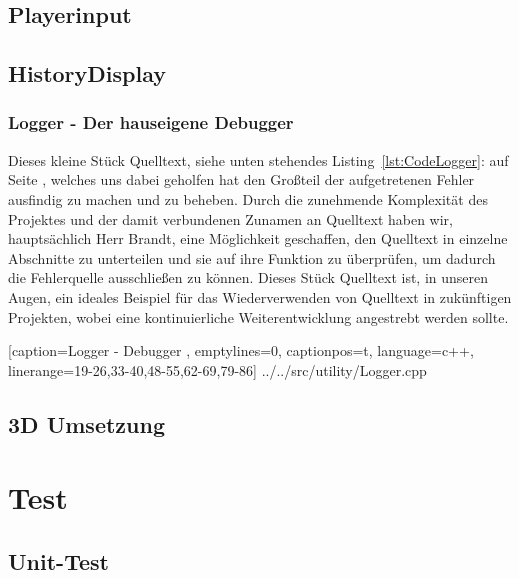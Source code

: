 \documentclass[a4paper]{scrartcl}
\begin{document}
\subsection{Playerinput}\label{ch:Playerinput}
\subsection{HistoryDisplay}\label{ch:HistoryDisplay}


\newpage
\subsubsection{Logger - Der hauseigene Debugger}\label{ch:Logger}
Dieses kleine Stück Quelltext, siehe unten stehendes Listing~\ref{lst:CodeLogger}: auf Seite \pageref{lst:CodeLogger}, welches uns dabei geholfen hat den Großteil der aufgetretenen Fehler ausfindig zu machen und zu beheben. Durch die zunehmende Komplexität des Projektes und der damit verbundenen Zunamen an Quelltext haben wir, hauptsächlich Herr Brandt, eine Möglichkeit geschaffen, den Quelltext in einzelne Abschnitte zu unterteilen und sie auf ihre Funktion zu überprüfen, um dadurch die Fehlerquelle ausschließen zu können. Dieses Stück Quelltext ist, in unseren Augen, ein ideales Beispiel für das Wiederverwenden von Quelltext in zukünftigen Projekten, wobei eine kontinuierliche Weiterentwicklung angestrebt werden sollte.

    [caption={Logger - Debugger} 	%
    	\label{lst:CodeLogger},			%
    emptylines=0,					%
    captionpos=t,					%
    language=c++,					%
    linerange={19-26,33-40,48-55,62-69,79-86}]%
{../../src/utility/Logger.cpp}		%
\subsection{3D Umsetzung}\label{ch:3DUmsetzung}

\section{Test}\label{ch:Test}
\subsection{Unit-Test}\label{ch:Unit}
\end{document}

